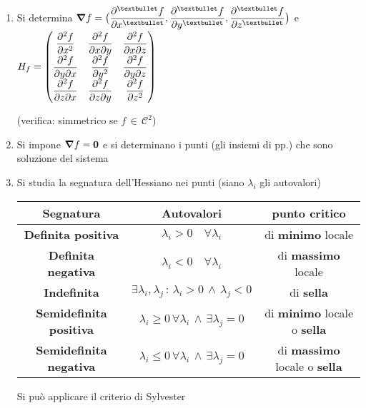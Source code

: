 \documentclass[10pt, oneside]{article}
\begin{document}
\begin{enumerate}

\item Si determina $\displaystyle \grad f = \big(
\pdv[•]{f}{x}, \pdv[•]{f}{y}, \pdv[•]{f}{z} \big)$ e $\displaystyle H_f = \begin{pmatrix}
\displaystyle \pdv[2]{f}{x} & \displaystyle \pdv{f}{x}{y} & \displaystyle \pdv[•]{f}{x}{z} \\
\displaystyle \pdv[]{f}{y}{x} & \displaystyle \pdv[2]{f}{y} & \displaystyle \pdv[•]{f}{y}{z} \\
\displaystyle \pdv[]{f}{z}{x} & \displaystyle \pdv{f}{z}{y} & \displaystyle \pdv[2]{f}{z} \\
\end{pmatrix}$

(verifica: simmetrico se $f \, \in \, \mathcal{C}^2$)

\item Si impone $\grad f = \mathbf{0}$ e si determinano i punti (gli insiemi di pp.) che sono soluzione del sistema

\item Si studia la segnatura dell'Hessiano nei punti (siano $\lambda_i$ gli autovalori)

\begin{table}
\centering
\begin{tabular}{c|c|c}
Segnatura & Autovalori & punto critico\\
\hline
\textbf{Definita positiva} & $\lambda_i > 0 \quad \forall \lambda_i$ & di \textbf{minimo} locale\\
\textbf{Definita negativa} & $\lambda_i < 0 \quad \forall \lambda_i$  & di \textbf{massimo} locale\\
\textbf{Indefinita} & $\exists \lambda_i, \lambda_j \, : \, \lambda_i > 0 \, \land \, \lambda_j < 0$ & di \textbf{sella}\\
\textbf{Semidefinita positiva} & $\lambda_i \geq 0 \, \forall \lambda_i \, \land \, \exists \lambda_j = 0$  & di \textbf{minimo} locale o \textbf{sella}\\
\textbf{Semidefinita negativa} & $\lambda_i \leq 0 \, \forall \lambda_i \, \land \, \exists \lambda_j = 0$  & di \textbf{massimo} locale o \textbf{sella}

\end{tabular}
\end{table}

Si può applicare il criterio di Sylvester


\end{enumerate}
\end{document}
